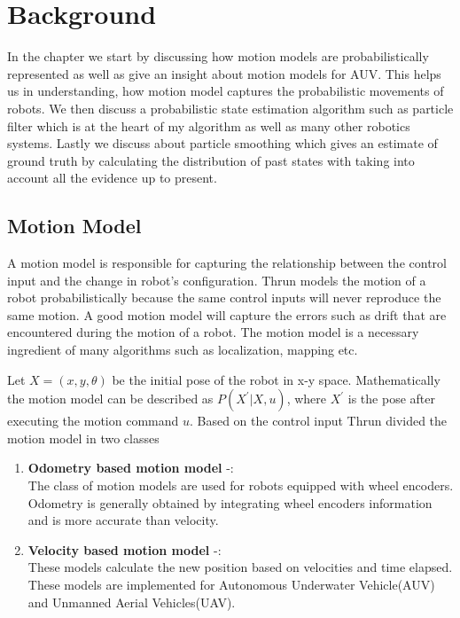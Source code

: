 \documentclass[12pt]{dalcsthesis}
\begin{document}
\chapter{Background}
In the chapter we start by discussing how motion models are probabilistically represented as well as give an insight about motion models for AUV. This helps us in understanding, how motion model captures the probabilistic movements of robots. We then discuss a probabilistic state estimation algorithm such as particle filter \cite{ristic2004beyond} \cite{chen2003bayesian} which is at the heart of my algorithm as well as many other robotics systems. Lastly we discuss about particle smoothing \cite{doucet2000monte} \cite{doucet2009tutorial} which gives an estimate of ground truth by calculating the distribution of past states with taking into account all the evidence up to present. 

\section{Motion Model}
\label{chap-:Motion Model}
A motion model is responsible for capturing the relationship between the control input and the change in robot's configuration. Thrun \cite{thrun2005probabilistic} models the motion of a robot probabilistically because the same
control inputs will never reproduce the same motion. A good motion model will capture the errors such as drift that are encountered during the motion of a robot. The motion model is a necessary ingredient of many algorithms such as localization, mapping etc. 

Let $X=(x,y,\theta)$ be the initial pose of the robot in x-y space. Mathematically the motion model can be described as $P(X^{'}|X,u)$, where $X^{'}$ is the pose after executing the motion command $u$. Based on the control input Thrun \cite{thrun2005probabilistic} divided the motion model in two classes
\begin{enumerate}
\item \textbf{Odometry based motion model} -: \\
The class of motion models are used for robots equipped with wheel encoders. Odometry is generally obtained by integrating wheel encoders information and is more accurate than velocity.  

\item \textbf{Velocity based motion model} -: \\
These models calculate the new position based on velocities and time elapsed. These models are implemented for Autonomous Underwater Vehicle(AUV) and Unmanned Aerial Vehicles(UAV). 
\end{enumerate}
\end{document}
